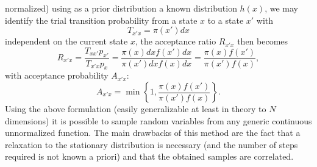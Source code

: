normalized) using as a prior distribution a known distribution $h(x)$, we may identify the trial transition probability from a state $x$ to 
a state $x'$ with
\begin{equation}
    T_{x'x}=\pi(x')dx
\end{equation}
independent on the current state $x$, the acceptance ratio $R_{x'x}$ then becomes
\begin{equation}
    R_{x'x}=\frac{T_{xx'}p_{x'}}{T_{x'x}p_{x}}=\frac{\pi(x)dxf(x')dx}{\pi(x')dxf(x)dx}=\frac{\pi(x)f(x')}{\pi(x')f(x)},
    \label{metropolis-hastings-continuous}
\end{equation}
with acceptance probability $A_{x'x}$:
\begin{equation}
    A_{x'x}=\min{\left\{1,\frac{\pi(x)f(x')}{\pi(x')f(x)}\right\}}.
    \label{acceptance_prob_distrib}
\end{equation}
Using the above formulation (easily generalizable at least in theory to $N$ dimensions) it is possible to sample random variables from any generic continuous 
unnormalized function. The main drawbacks of this method are the fact that a relaxation to the stationary distribution is necessary (and the number of steps required is 
not known a priori) and that the obtained samples are correlated.

